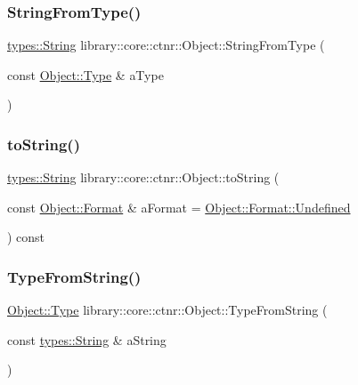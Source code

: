 \subsubsection{\texorpdfstring{String\+From\+Type()}{StringFromType()}}
{\footnotesize\ttfamily \hyperlink{classlibrary_1_1core_1_1types_1_1_string}{types\+::\+String} library\+::core\+::ctnr\+::\+Object\+::\+String\+From\+Type (\begin{DoxyParamCaption}\item[{const \hyperlink{classlibrary_1_1core_1_1ctnr_1_1_object_a0766006ad111133d70349019551b31d6}{Object\+::\+Type} \&}]{a\+Type }\end{DoxyParamCaption})\hspace{0.3cm}{\ttfamily [static]}}

\mbox{\label{classlibrary_1_1core_1_1ctnr_1_1_object_a5398bda4792be6ad5c2d07429c83d110}} 
\subsubsection{\texorpdfstring{to\+String()}{toString()}}
{\footnotesize\ttfamily \hyperlink{classlibrary_1_1core_1_1types_1_1_string}{types\+::\+String} library\+::core\+::ctnr\+::\+Object\+::to\+String (\begin{DoxyParamCaption}\item[{const \hyperlink{classlibrary_1_1core_1_1ctnr_1_1_object_a7bf8961c4ef65f691aa2993ec405c647}{Object\+::\+Format} \&}]{a\+Format = {\ttfamily \hyperlink{classlibrary_1_1core_1_1ctnr_1_1_object_a7bf8961c4ef65f691aa2993ec405c647aec0fc0100c4fc1ce4eea230c3dc10360}{Object\+::\+Format\+::\+Undefined}} }\end{DoxyParamCaption}) const}

\mbox{\label{classlibrary_1_1core_1_1ctnr_1_1_object_a24126bc23a9ab818f3e64fc330c52fcc}} 
\subsubsection{\texorpdfstring{Type\+From\+String()}{TypeFromString()}}
{\footnotesize\ttfamily \hyperlink{classlibrary_1_1core_1_1ctnr_1_1_object_a0766006ad111133d70349019551b31d6}{Object\+::\+Type} library\+::core\+::ctnr\+::\+Object\+::\+Type\+From\+String (\begin{DoxyParamCaption}\item[{const \hyperlink{classlibrary_1_1core_1_1types_1_1_string}{types\+::\+String} \&}]{a\+String }\end{DoxyParamCaption})\hspace{0.3cm}{\ttfamily [static]}}

